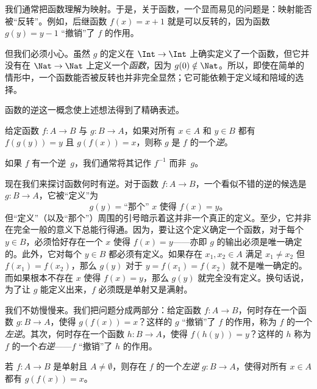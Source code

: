 \documentclass[../../../include/open-logic-section]{subfiles}
\begin{document}

\begin{explain}
我们通常把函数理解为映射。于是，关于函数，一个显而易见的问题是：映射能否被“反转”。例如，后继函数 $f(x) = x + 1$ 就是可以反转的，因为函数 $g(y) = y - 1$ “撤销”了 $f$ 的作用。

但我们必须小心。虽然 $g$ 的定义在 $\Int \to \Int$ 上确实定义了一个函数，但它并没有在 $\Nat \to \Nat$ 上定义一个\emph{函数}，因为 $g(0) \notin \Nat$。所以，即使在简单的情形中，一个函数能否被反转也并非完全显然；它可能依赖于定义域和陪域的选择。

函数的逆这一概念使上述想法得到了精确表述。
\end{explain}

\begin{defn}
给定函数 $f \colon A \to B$ 与 $g \colon B \to A$，如果对所有 $x \in A$ 和 $y \in B$ 都有 $f(g(y)) = y$ 且 $g(f(x)) = x$，则称 $g$ 是 $f$ 的一个\emph{逆}。
\end{defn}

如果 $f$ 有一个逆~$g$，我们通常将其记作 $f^{-1}$ 而非~$g$。

\begin{explain}
现在我们来探讨函数何时有逆。对于函数 $f\colon A \to B$，一个看似不错的逆的候选是 $g\colon B \to A$，它被“定义”为
\[
g(y) = \text{“那个” $x$ 使得 $f(x) = y$。}
\]
但“定义”（以及“那个”）周围的引号暗示着这并非一个真正的定义。至少，它并非在完全一般的意义下总能行得通。因为，要让这个定义确定一个函数，对于每个 $y \in B$，必须恰好存在一个 $x$ 使得 $f(x) = y$——亦即 $g$ 的输出必须是唯一确定的。此外，它对每个 $y \in B$ 都必须有定义。如果存在 $x_1, x_2 \in A$ 满足 $x_1 \neq x_2$ 但 $f(x_1) = f(x_2)$，那么 $g(y)$ 对于 $y = f(x_1) = f(x_2)$ 就不是唯一确定的。而如果根本不存在 $x$ 使得 $f(x) = y$，那么 $g(y)$ 就完全没有定义。换句话说，为了让 $g$ 能定义出来，$f$ 必须既是单射又是满射。

我们不妨慢慢来。我们把问题分成两部分：给定函数 $f\colon A \to B$，何时存在一个函数 $g\colon B \to A$，使得 $g(f(x)) = x$？这样的 $g$ “撤销”了 $f$ 的作用，称为 $f$ 的一个\emph{左逆}。其次，何时存在一个函数 $h\colon B \to A$，使得 $f(h(y)) = y$？这样的 $h$ 称为 $f$ 的一个\emph{右逆}——$f$ “撤销”了 $h$ 的作用。
\end{explain}

\begin{prop}
若 $f\colon A \to B$ 是单射且 $A \neq \emptyset$，则存在 $f$ 的一个\emph{左逆} $g\colon B \to A$，使得对所有 $x \in A$ 都有 $g(f(x)) = x$。
\end{prop}
\end{document}

